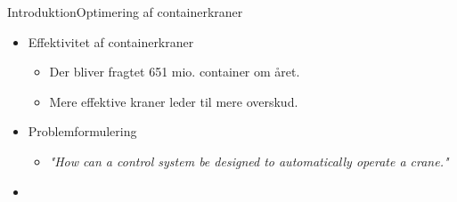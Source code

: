 
\begin{frame}{Introduktion}{Optimering af containerkraner}


 \begin{minipage}[t]{0.45\linewidth}
  \begin{itemize}
    \item<1-> Effektivitet af containerkraner 
        \begin{itemize}
          \item<1-> Der bliver fragtet 651 mio. container om året.
          \item<1-> Mere effektive kraner leder til mere overskud. 
        \end{itemize}
    \item<1-> Problemformulering
        \begin{itemize}
          \item<1-> \textit{"How can a control system be designed to automatically operate a crane."}
        \end{itemize}
  \end{itemize}
  \end{minipage}
  \begin{minipage}[t]{0.42\linewidth}
    \begin{itemize}
      \item<1->[] {
}
    \end{itemize}                   
  \end{minipage}
  \end{frame}


